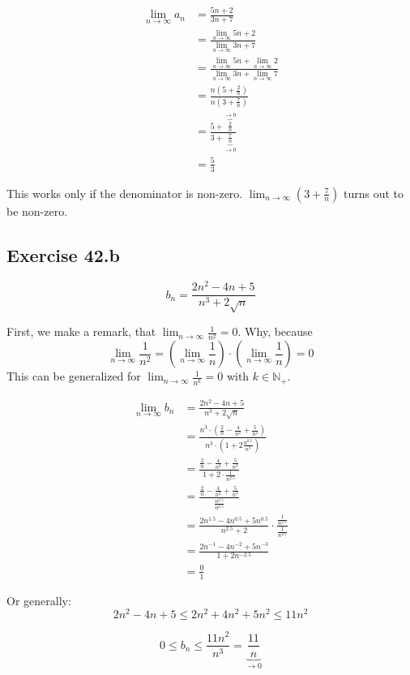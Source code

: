 \documentclass[a4paper]{article}
\theoremstyle{definition}
\begin{document}
\begin{align*}
  \lim_{n\to\infty} a_n &= \frac{5n+2}{3n+7} \\
      &= \frac{\lim_{n\to\infty} 5n+2}{\lim_{n\to\infty} 3n+7} \\
      &= \frac{\lim_{n\to\infty} 5n + \lim_{n\to\infty} 2}{\lim_{n\to\infty} 3n + \lim_{n\to\infty} 7} \\
      &= \frac{n(5 + \frac2n)}{n(3+\frac7n)} \\
      &= \frac{5 + \overbrace{\frac2n}^{\to0}}{3+\underbrace{\frac7n}_{\to0}} \\
      &= \frac53
\end{align*}

This works only if the denominator is non-zero. $\lim_{n\to\infty} (3 + \frac7n)$ turns out to be non-zero.

\subsection{Exercise 42.b}
\[ b_n = \frac{2n^2-4n+5}{n^3+2\sqrt{n}} \]

First, we make a remark, that $\lim_{n\to\infty} \frac1{n^2} = 0$. Why, because
\[ \lim_{n\to\infty} \frac1{n^2} = \left(\lim_{n\to\infty} \frac1n\right) \cdot \left(\lim_{n\to\infty} \frac1n\right) = 0 \]
This can be generalized for $\lim_{n\to\infty} \frac1{n^k} = 0$ with $k\in\mathbb N_+$.

\begin{align*}
  \lim_{n\to\infty} b_n &= \frac{2n^2 - 4n + 5}{n^3 + 2\sqrt{n}} \\
    &= \frac{n^3\cdot\left(\frac2n - \frac4{n^2} + \frac5{n^2}\right)}{n^3\cdot\left(1 + 2\frac{n^{0.5}}{n^3}\right)} \\
    &= \frac{\frac2n - \frac4{n^2} + \frac5{n^3}}{1 + 2\cdot \frac1{n^{2.5}}} \\
    &= \frac{\frac2n - \frac4{n^2} + \frac5{n^3}}{\frac{n^{2.5}}{n^{2.5}}} \\
    &= \frac{2n^{1.5} - 4n^{0.5} + 5n^{0.5}}{n^{2.5} + 2} \cdot \frac{\frac1{n^{2.5}}}{\frac1{n^{2.5}}} \\
    &= \frac{2n^{-1} - 4n^{-2} + 5n^{-3}}{1 + 2n^{-2.5}} \\
    &= \frac01
\end{align*}

Or generally:
\[ 2n^2 - 4n + 5 \leq 2n^2 + 4n^2 + 5n^2 \leq 11n^2 \]

\[ 0 \leq b_n \leq \frac{11n^2}{n^3} = \underbrace{\frac{11}{n}}_{\to0} \]
\end{document}
